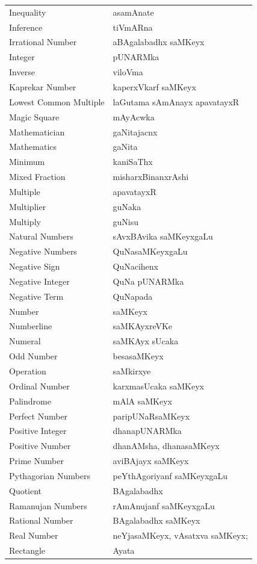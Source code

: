 \begin{longtable}{>{\rm}l@{\hspace{1.25cm}}l}
Inequality & asamAnate\\
Inference & tiVmARna\\
Irrational Number & aBAgalabadhx saMKeyx\\
Integer & pUNARMka\\
Inverse & viloVma\\
Kaprekar Number & kaperxVkarf saMKeyx\\
Lowest Common Multiple & laGutama sAmAnayx apavatayxR\\
Magic Square & mAyAcwka\\
Mathematician & gaNitajacnx\\
Mathematics & gaNita\\
Minimum & kaniSaThx\\
Mixed Fraction & misharxBinanxrAshi\\
Multiple & apavatayxR\\
Multiplier & guNaka\\
Multiply & guNisu\\
Natural Numbers & sAvxBAvika saMKeyxgaLu\\
Negative Numbers & QuNasaMKeyxgaLu\\
Negative Sign & QuNacihenx\\
Negative Integer & QuNa pUNARMka\\
Negative Term & QuNapada\\
Number & saMKeyx\\
Numberline & saMKAyxreVKe\\
Numeral & saMKAyx sUcaka\\
Odd Number & besasaMKeyx\\
Operation & saMkirxye\\
Ordinal Number & karxmasUcaka saMKeyx\\
Palindrome & mAlA saMKeyx\\
Perfect Number & paripUNaRsaMKeyx\\
Positive Integer & dhanapUNARMka\\
Positive Number & dhanAMsha, dhanasaMKeyx\\
Prime Number & aviBAjayx saMKeyx\\
Pythagorian Numbers  & peYthAgoriyanf saMKeyxgaLu\\
Quotient & BAgalabadhx\\
Ramanujan Numbers & rAmAnujanf saMKeyxgaLu\\
Rational Number & BAgalabadhx saMKeyx\\
Real Number & neYjasaMKeyx, vAsatxva saMKeyx;\\
Rectangle & Ayata\\

\end{longtable}
